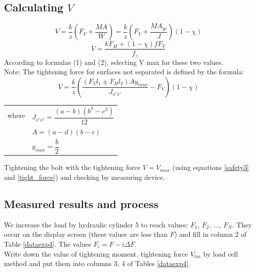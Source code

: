 \subsection{Calculating $ V $}
\begin{equation}
	V = \dfrac{k}{z}\left(F_V+\dfrac{MA}{W}\right) = \dfrac{k}{z}\left(F_V+\dfrac{MA_{yc}}{J}\right)(1-\chi)
	\label{safety3}
\end{equation}
\begin{equation}
	V = \dfrac{kF_H+(1-\chi)fF_V}{f_z}
	\label{tight_force}
\end{equation}
According to formulas (1) and (2), selecting V max for these two values.\\
Note: The tightening force for surfaces not separated is defined by the formula:
\[V = \dfrac{k}{z}\left(\dfrac{(F_Vl_1\pm F_Hl_2)Ay_{max}}{J_{x'x'}}-F_V\right)(1-\chi)\]
\begin{tabular}{ll}
	where & $ J_{x'x'} = \dfrac{(a-b)(b^3-c^3)}{12} $\\
	& $ A = (a-d)(b-c) $\\
	& $ y_{max} = \dfrac{b}{2} $\\
\end{tabular}\vskip2mm
Tightening the bolt with the tightening force $ V = V_{max} $ (using equations \ref{safety3} and \ref{tight_force}) and
checking by measuring device.
\subsection{Measured results and process}
We increase the load by hydraulic cylinder 5 to reach values: $ F_1 $, $ F_2 $, ..., $ F_N $. They occur on the display screen (these values are less than $ F $) and fill in column 2 of Table \ref{dataexp4}. The values $ F_i = F - i\Delta F $.\\
Write down the value of tightening moment, tightening force $ V_{tni} $ by load cell method
and put them into columns 3, 4 of Tables \ref{dataexp4}.

